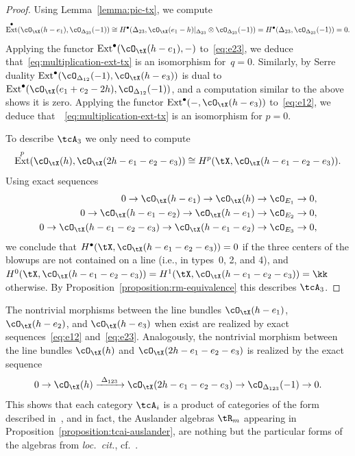 \documentclass[11pt]{amsart}
\DeclareMathOperator{\Ext}{\mathrm{Ext}}
\theoremstyle{plain}
\theoremstyle{definition}
\theoremstyle{remark}
\begin{document}
\begin{proof}
Using Lemma~\ref{lemma:pic-tx}, we compute
\begin{equation*}
\Ext^\bullet(\cO_\tX(h-e_1),\cO_{\Delta_{23}}(-1)) \cong
H^\bullet(\Delta_{23},\cO_\tX(e_1 - h)\vert_{\Delta_{23}} \otimes \cO_{\Delta_{23}}(-1)) =
H^\bullet(\Delta_{23},\cO_{\Delta_{23}}(-1)) = 0.
\end{equation*}
Applying the functor $\Ext^\bullet(\cO_\tX(h-e_1),-)$ to~\eqref{eq:e23}, we deduce that~\eqref{eq:multiplication-ext-tx} is an isomorphism for~$q = 0$. 
Similarly, by Serre duality $\Ext^\bullet(\cO_{\Delta_{12}}(-1),\cO_\tX(h-e_3))$ is dual to $\Ext^\bullet(\cO_\tX(e_1 + e_2 - 2h),\cO_{\Delta_{12}}(-1))$, and
a computation similar to the above shows it is zero.
Applying the functor $\Ext^\bullet(-,\cO_\tX(h-e_3))$ to~\eqref{eq:e12}, we deduce that~~\eqref{eq:multiplication-ext-tx} is an isomorphism for $p = 0$. 

To describe $\tcA_3$ we only need to compute 
\begin{equation*}
\Ext^p(\cO_\tX(h), \cO_\tX(2h - e_1 - e_2 - e_3)) \cong H^p(\tX, \cO_\tX(h - e_1 - e_2 - e_3)).
\end{equation*}
Using exact sequences
\begin{align*}
0 \to \cO_\tX(h - e_1) \to \cO_\tX(h) &\to \cO_{E_1} \to 0,\\
0 \to \cO_\tX(h - e_1 - e_2) \to \cO_\tX(h - e_1) &\to \cO_{E_2} \to 0,\\
0 \to \cO_\tX(h - e_1 - e_2 - e_3) \to \cO_\tX(h - e_1 - e_2) &\to \cO_{E_3} \to 0,
\end{align*}
we conclude that $H^\bullet(\tX, \cO_\tX(h - e_1 - e_2 - e_3)) = 0$ 
if the three centers of the blowups are not contained on a line (i.e., in types~0, 2, and 4), and 
$H^0(\tX, \cO_\tX(h - e_1 - e_2 - e_3)) = H^1(\tX, \cO_\tX(h - e_1 - e_2 - e_3)) = \kk$ otherwise.
By Proposition~\ref{proposition:rm-equivalence} this describes $\tcA_3$.
\end{proof}

The nontrivial morphisms between the line bundles $\cO_\tX(h-e_1)$, $\cO_\tX(h-e_2)$, and $\cO_\tX(h-e_3)$ when exist are realized by exact sequences~\eqref{eq:e12} and~\eqref{eq:e23}.
Analogously, the nontrivial morphism between the line bundles $\cO_\tX(h)$ and $\cO_\tX(2h - e_1 - e_2 - e_3)$ is realized by the exact sequence
\begin{equation}\label{eq:e123}
0 \to \cO_\tX(h) \xrightarrow{\ \Delta_{123}\ } \cO_\tX(2h - e_1 - e_2 - e_3) \to \cO_{\Delta_{123}}(-1) \to 0.
\end{equation}
This shows that each category $\tcA_i$ is a product of categories of the form described in~\cite[Theorem~2.5]{hille2017tilting},
and in fact, the Auslander algebras $\tR_m$ appearing in Proposition~\ref{proposition:tcai-auslander},
are nothing but the particular forms of the algebras from \emph{loc.\ cit.}, cf.~\cite[\S3.2]{hille2017tilting}.
\end{document}
